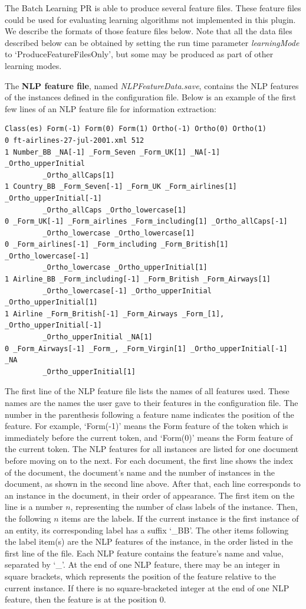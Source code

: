 The Batch Learning PR is able to produce several feature files. These feature
files could be used for evaluating learning algorithms not implemented in this
plugin. We describe the formats of those feature files below.  Note that all the
data files described below can be obtained by setting the run time parameter {\em
learningMode} to `ProduceFeatureFilesOnly', but some may be produced as part of
other learning modes.

The {\bf NLP feature file}, named {\em NLPFeatureData.save}, contains the NLP
features of the instances defined in the configuration file. Below is an
example of the first few lines of an NLP feature file for information extraction:

{\small
\begin{verbatim}
Class(es) Form(-1) Form(0) Form(1) Ortho(-1) Ortho(0) Ortho(1)
0 ft-airlines-27-jul-2001.xml 512
1 Number_BB _NA[-1] _Form_Seven _Form_UK[1] _NA[-1] _Ortho_upperInitial
		 _Ortho_allCaps[1]
1 Country_BB _Form_Seven[-1] _Form_UK _Form_airlines[1] _Ortho_upperInitial[-1] 
         _Ortho_allCaps _Ortho_lowercase[1]
0 _Form_UK[-1] _Form_airlines _Form_including[1] _Ortho_allCaps[-1]
		 _Ortho_lowercase _Ortho_lowercase[1]
0 _Form_airlines[-1] _Form_including _Form_British[1] _Ortho_lowercase[-1]
         _Ortho_lowercase _Ortho_upperInitial[1]
1 Airline_BB _Form_including[-1] _Form_British _Form_Airways[1] 
         _Ortho_lowercase[-1] _Ortho_upperInitial _Ortho_upperInitial[1]
1 Airline _Form_British[-1] _Form_Airways _Form_[1], _Ortho_upperInitial[-1] 
         _Ortho_upperInitial _NA[1]
0 _Form_Airways[-1] _Form_, _Form_Virgin[1] _Ortho_upperInitial[-1] _NA 
         _Ortho_upperInitial[1]
\end{verbatim}
}

The first line of the NLP feature file lists the names of all features used.
These names are the names the user gave to their features in the configuration
file. The number in the parenthesis following a feature name indicates the
position of the feature. For example, `Form(-1)' means the Form feature of the
token which is immediately before the current token, and `Form(0)' means the
Form feature of the current token.  The NLP features for all instances are listed
for one document before moving on to the next.  For each document, the first line
shows the index of the document, the document's name and the number of instances
in the document, as shown in the second line above.  After that, each line
corresponds to an instance in the document, in their order of appearance. The
first item on the line is a number $n$, representing the number of class labels
of the instance. Then, the following $n$ items are the labels. If the current
instance is the first instance of an entity, its corresponding label has a suffix
`\_BB'. The other items following the label item(s) are the NLP features of the
instance, in the order listed in the first line of the file. Each NLP feature
contains the feature's name and value, separated by `\_'. At the end of one NLP
feature, there may be an integer in square brackets, which represents the
position of the feature relative to the current instance. If there is no
square-bracketed integer at the end of one NLP feature, then the feature is at
the position 0.

